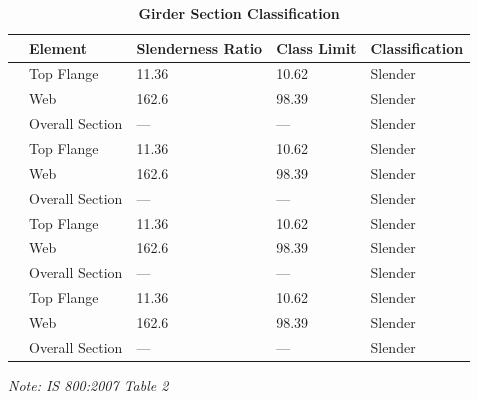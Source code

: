 \documentclass[12pt,a4paper]{report}
\numberwithin{table}{chapter}
\numberwithin{figure}{chapter}
\begin{document}
\vspace{1em}
\begin{longtable}{|C{2.5cm}|L{3cm}|C{3.5cm}|C{2.5cm}|>{\centering\arraybackslash}p{4.0cm}|}
\caption{\textbf{Girder Section Classification}}
\hline
\textbf{} & \textbf{Element} & \textbf{Slenderness Ratio} & \textbf{Class Limit} & \textbf{Classification} \\[6pt]
\hline
{} & Top Flange & 11.36 & 10.62 & Slender \\[6pt]
 & Web & 162.6 & 98.39 & Slender \\[6pt]
 & Overall Section & --- & --- & Slender \\[6pt]
\hline
{} & Top Flange & 11.36 & 10.62 & Slender \\[6pt]
 & Web & 162.6 & 98.39 & Slender \\[6pt]
 & Overall Section & --- & --- & Slender \\[6pt]
\hline
{} & Top Flange & 11.36 & 10.62 & Slender \\[6pt]
 & Web & 162.6 & 98.39 & Slender \\[6pt]
 & Overall Section & --- & --- & Slender \\[6pt]
\hline
{} & Top Flange & 11.36 & 10.62 & Slender \\[6pt]
 & Web & 162.6 & 98.39 & Slender \\[6pt]
 & Overall Section & --- & --- & Slender \\[6pt]
\hline
\end{longtable}
\noindent\textit{Note: IS 800:2007 Table 2}
\end{document}
